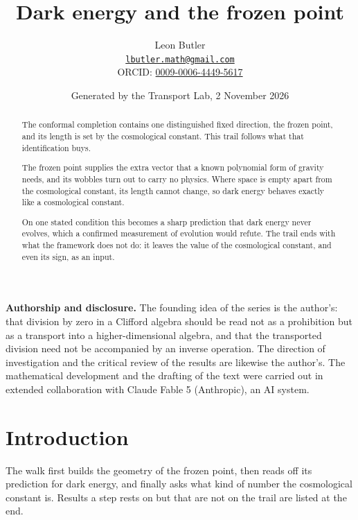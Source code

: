 \documentclass[11pt]{article}
\title{\bfseries Dark energy and the frozen point}
\author{Leon Butler\\ \normalsize\href{mailto:lbutler.math@gmail.com}{\texttt{lbutler.math@gmail.com}}\\ \normalsize ORCID: \href{https://orcid.org/0009-0006-4449-5617}{0009-0006-4449-5617}}
\date{Generated by the Transport Lab, 2 November 2026}
\theoremstyle{definition}
\theoremstyle{plain}
\begin{document}
\maketitle
\begin{abstract}
\normalsize
The conformal completion contains one distinguished fixed direction, the frozen point, and its length is set by the cosmological constant. This trail follows what that identification buys.

The frozen point supplies the extra vector that a known polynomial form of gravity needs, and its wobbles turn out to carry no physics. Where space is empty apart from the cosmological constant, its length cannot change, so dark energy behaves exactly like a cosmological constant.

On one stated condition this becomes a sharp prediction that dark energy never evolves, which a confirmed measurement of evolution would refute. The trail ends with what the framework does not do: it leaves the value of the cosmological constant, and even its sign, as an input.
\end{abstract}
\newpage
\noindent \textbf{Authorship and disclosure. }The founding idea of the series is the author's: that division by zero in a Clifford algebra should be read not as a prohibition but as a transport into a higher-dimensional algebra, and that the transported division need not be accompanied by an inverse operation. The direction of investigation and the critical review of the results are likewise the author's. The mathematical development and the drafting of the text were carried out in extended collaboration with Claude Fable 5 (Anthropic), an AI system.

\noindent{}
\newpage

\section*{Introduction}
The walk first builds the geometry of the frozen point, then reads off its prediction for dark energy, and finally asks what kind of number the cosmological constant is. Results a step rests on but that are not on the trail are listed at the end.
\end{document}
